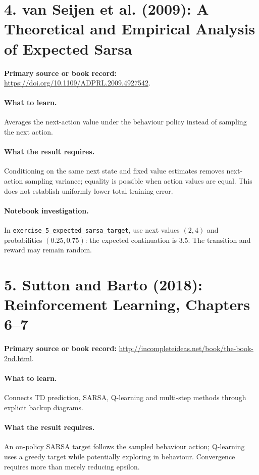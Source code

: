 \documentclass[11pt]{scrartcl}
\begin{document}
\section*{4. van Seijen et al. (2009): A Theoretical and Empirical Analysis of Expected Sarsa}
\textbf{Primary source or book record:} \url{https://doi.org/10.1109/ADPRL.2009.4927542}.

\paragraph{What to learn.} Averages the next-action value under the behaviour policy instead of sampling the next action.

\paragraph{What the result requires.} Conditioning on the same next state and fixed value estimates removes next-action sampling variance; equality is possible when action values are equal. This does not establish uniformly lower total training error.

\paragraph{Notebook investigation.} In \texttt{exercise\_5\_expected\_sarsa\_target}, use next values $(2,4)$ and probabilities $(0.25,0.75)$: the expected continuation is 3.5. The transition and reward may remain random.

\section*{5. Sutton and Barto (2018): Reinforcement Learning, Chapters 6--7}
\textbf{Primary source or book record:} \url{http://incompleteideas.net/book/the-book-2nd.html}.

\paragraph{What to learn.} Connects TD prediction, SARSA, Q-learning and multi-step methods through explicit backup diagrams.

\paragraph{What the result requires.} An on-policy SARSA target follows the sampled behaviour action; Q-learning uses a greedy target while potentially exploring in behaviour. Convergence requires more than merely reducing epsilon.
\end{document}
